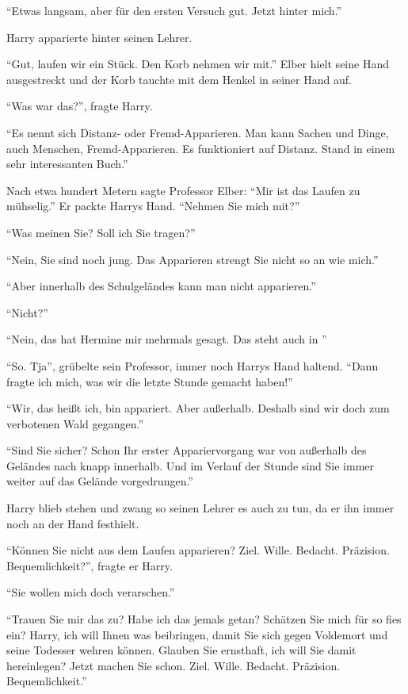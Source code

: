 \enquote{Etwas langsam, aber für den ersten Versuch gut. Jetzt hinter mich.}

Harry apparierte hinter seinen Lehrer.

\enquote{Gut, laufen wir ein Stück. Den Korb nehmen wir mit.} Elber hielt seine Hand ausgestreckt und der Korb tauchte mit dem Henkel in seiner Hand auf.

\enquote{Was war das?}, fragte Harry.

\enquote{Es nennt sich Distanz- oder Fremd-Apparieren. Man kann Sachen und Dinge, auch Menschen, Fremd-Apparieren. Es funktioniert auf Distanz. Stand in einem sehr interessanten Buch.}

Nach etwa hundert Metern sagte Professor Elber: \enquote{Mir ist das Laufen zu mühselig.} Er packte Harrys Hand. \enquote{Nehmen Sie mich mit?}

\enquote{Was meinen Sie? Soll ich Sie tragen?}

\enquote{Nein, Sie sind noch jung. Das Apparieren strengt Sie nicht so an wie mich.}

\enquote{Aber innerhalb des Schulgeländes kann man nicht apparieren.}

\enquote{Nicht?}

\enquote{Nein, das hat Hermine mir mehrmals gesagt. Das steht auch in }

\enquote{So. Tja}, grübelte sein Professor, immer noch Harrys Hand haltend. \enquote{Dann fragte ich mich, was wir die letzte Stunde gemacht haben!}

\enquote{Wir, das heißt ich, bin appariert. Aber außerhalb. Deshalb sind wir doch zum verbotenen Wald gegangen.}

\enquote{Sind Sie sicher? Schon Ihr erster Appariervorgang war von außerhalb des Geländes nach knapp innerhalb. Und im Verlauf der Stunde sind Sie immer weiter auf das Gelände vorgedrungen.}

Harry blieb stehen und zwang so seinen Lehrer es auch zu tun, da er ihn immer noch an der Hand festhielt.

\enquote{Können Sie nicht aus dem Laufen apparieren? \gst Ziel. Wille. Bedacht. Präzision. Bequemlichkeit?}, fragte er Harry.

\enquote{Sie wollen mich doch verarschen.}

\enquote{Trauen Sie mir das zu? Habe ich das jemals getan? Schätzen Sie mich für so fies ein? Harry, ich will Ihnen was beibringen, damit Sie sich gegen Voldemort und seine Todesser wehren können. Glauben Sie ernsthaft, ich will Sie damit hereinlegen? \gst Jetzt machen Sie schon. Ziel. Wille. Bedacht. Präzision. Bequemlichkeit.}

